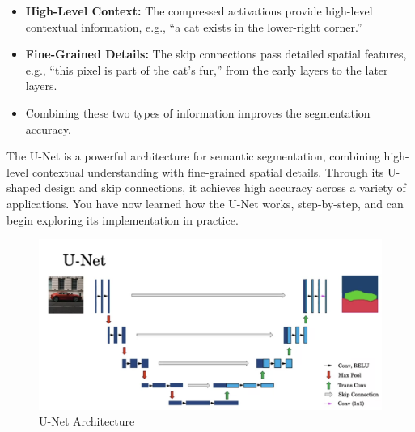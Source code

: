 \documentclass[letterpaper,12pt,notitlepage,twoside]{report}
\begin{document}
\begin{itemize}
    \item \textbf{High-Level Context:} The compressed activations provide high-level contextual information, e.g., ``a cat exists in the lower-right corner.''
    \item \textbf{Fine-Grained Details:} The skip connections pass detailed spatial features, e.g., ``this pixel is part of the cat's fur,'' from the early layers to the later layers.
    \item Combining these two types of information improves the segmentation accuracy.
\end{itemize}

The U-Net is a powerful architecture for semantic segmentation, combining high-level contextual understanding with fine-grained spatial details. Through its U-shaped design and skip connections, it achieves high accuracy across a variety of applications. You have now learned how the U-Net works, step-by-step, and can begin exploring its implementation in practice.

\begin{figure}[h]
	\centering
	\includegraphics[width=\textwidth]{Images/U-Net.png}
	\caption{U-Net Architecture}
	\label{fig:52}
\end{figure}
\FloatBarrier
\end{document}
